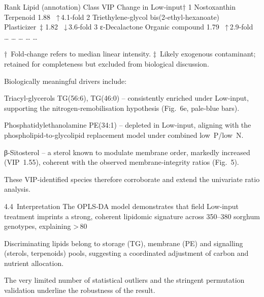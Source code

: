 \documentclass[10pt,letterpaper]{article}
\begin{document}
Rank	Lipid (annotation)	Class	VIP	Change in Low‑input†
1	Nostoxanthin	Terpenoid	1.88	 ↑ 4.1‑fold
2	Triethylene‑glycol bis(2‑ethyl‑hexanoate)	Plasticizer ‡	1.82	 ↓ 3.6‑fold
3	ε‑Decalactone	Organic compound	1.79	 ↑ 2.9‑fold
…	…	…	…	…

† Fold‑change refers to median linear intensity.
‡ Likely exogenous contaminant; retained for completeness but excluded from biological discussion.

Biologically meaningful drivers include:

Triacyl‑glycerols TG(56:6), TG(46:0) – consistently enriched under Low‑input, supporting the nitrogen‑remobilisation hypothesis (Fig. 6e, pale‑blue bars).

Phosphatidylethanolamine PE(34:1) – depleted in Low‑input, aligning with the phospholipid‑to‑glycolipid replacement model under combined low P/low N.

β‑Sitosterol – a sterol known to modulate membrane order, markedly increased (VIP 1.55), coherent with the observed membrane‑integrity ratios (Fig. 5).

These VIP‑identified species therefore corroborate and extend the univariate ratio analysis.

4.4 Interpretation
The OPLS‑DA model demonstrates that field Low‑input treatment imprints a strong, coherent lipidomic signature across 350–380 sorghum genotypes, explaining > 80 %

Discriminating lipids belong to storage (TG), membrane (PE) and signalling (sterols, terpenoids) pools, suggesting a coordinated adjustment of carbon and nutrient allocation.

The very limited number of statistical outliers and the stringent permutation validation underline the robustness of the result.
\end{document}
